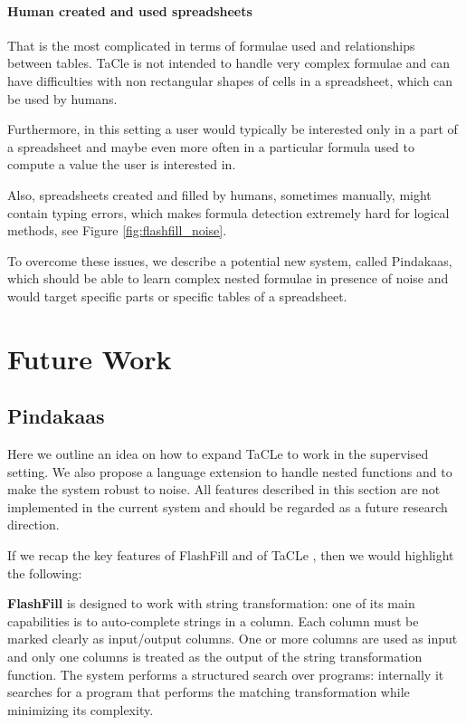 \paragraph{Human created and used spreadsheets}
That is the most complicated in terms of formulae used and relationships between tables. TaCle is not intended to handle very complex formulae and can have difficulties with non rectangular shapes of cells in a spreadsheet, which can be used by humans.

Furthermore, in this setting a user would typically be interested only in a part of a spreadsheet and maybe even more often in a particular formula used to compute a value the user is interested in.

Also, spreadsheets created and filled by humans, sometimes manually, might contain typing errors, which makes formula detection extremely hard for logical methods, see Figure \ref{fig:flashfill_noise}.

To overcome these issues, we describe a potential new system, called Pindakaas, which should be able to learn complex nested formulae in presence of noise and would target specific parts or specific tables of a spreadsheet.

\pubrevend

\section{Future Work}
\subsection{Pindakaas} \label{subsection:pindakaas}
\pubrev
Here we outline an idea on how to expand TaCLe to work in
the supervised setting. We also propose a language extension to
handle nested functions and to make the system robust to noise. All features described in this section are not implemented in the current system and should be regarded as a future research direction.
\pubrevend

If we recap the key features of FlashFill \parencite{flashfill} and of TaCLe
\parencite{tacle}, then we would highlight the following:

\textbf{FlashFill} is designed to work with string transformation: one of its main capabilities is to
  auto-complete strings in a column. Each column must be marked clearly as input/output columns. One or more columns are used as
  input and only one columns is treated as the output of the string
  transformation function. The system performs a structured search over programs: internally it searches for a
  program that performs the matching transformation while minimizing its complexity.

